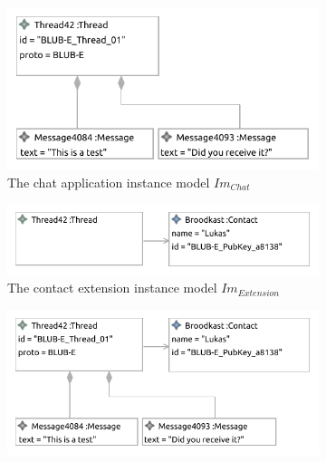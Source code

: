 \begin{figure}
    \centering
    \begin{subfigure}{\textwidth}
        \centering
        \includegraphics{images/04_transformation_framework/instance_models_combination/chat_instance_partial1.pdf}
        \caption{The chat application instance model $Im_{Chat}$}
        \label{fig:transformation_framework:instance_models_and_instance_graphs:combining_instance_models:combine_example_imod1}
    \end{subfigure}
    \par\medskip
    \begin{subfigure}{\textwidth}
        \centering
        \includegraphics{images/04_transformation_framework/instance_models_combination/chat_instance_partial2.pdf}
        \caption{The contact extension instance model $Im_{Extension}$}
        \label{fig:transformation_framework:instance_models_and_instance_graphs:combining_instance_models:combine_example_imod2}
    \end{subfigure}
    \par\medskip
    \begin{subfigure}{\textwidth}
        \centering
        \includegraphics{images/04_transformation_framework/instance_models_combination/chat_instance_combined.pdf}

\end{subfigure}
\end{figure}

